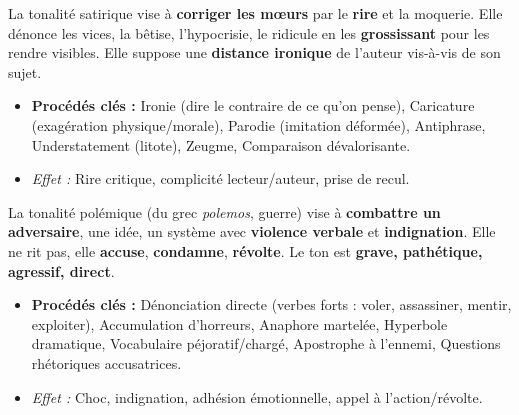 \documentclass[11pt]{article}
\newcommand{\cle}[1]{{\popxbold\color{popdark}#1}}
\begin{document}
\begin{definition}
La \cle{tonalité satirique} vise à \textbf{corriger les mœurs} par le \textbf{rire} et la \cle{moquerie}. Elle dénonce les vices, la bêtise, l'hypocrisie, le ridicule en les \textbf{grossissant} pour les rendre visibles. Elle suppose une \textbf{distance ironique} de l'auteur vis-à-vis de son sujet.
\begin{itemize}
\item \textbf{Procédés clés :} \cle{Ironie} (dire le contraire de ce qu'on pense), \cle{Caricature} (exagération physique/morale), \cle{Parodie} (imitation déformée), \cle{Antiphrase}, \cle{Understatement} (litote), \cle{Zeugme}, \cle{Comparaison dévalorisante}.
\item \textit{Effet :} Rire critique, complicité lecteur/auteur, prise de recul.
\end{itemize}
\end{definition}

\begin{definition}
La \cle{tonalité polémique} (du grec \textit{polemos}, guerre) vise à \textbf{combattre un adversaire}, une idée, un système avec \textbf{violence verbale} et \textbf{indignation}. Elle ne rit pas, elle \textbf{accuse}, \textbf{condamne}, \textbf{révolte}. Le ton est \textbf{grave, pathétique, agressif, direct}.
\begin{itemize}
\item \textbf{Procédés clés :} \cle{Dénonciation directe} (verbes forts : voler, assassiner, mentir, exploiter), \cle{Accumulation} d'horreurs, \cle{Anaphore} martelée, \cle{Hyperbole} dramatique, \cle{Vocabulaire péjoratif/chargé}, \cle{Apostrophe} à l'ennemi, \cle{Questions rhétoriques} accusatrices.
\item \textit{Effet :} Choc, indignation, adhésion émotionnelle, appel à l'action/révolte.
\end{itemize}
\end{definition}
\end{document}
